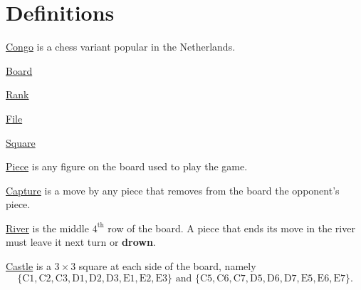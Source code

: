 \section{Definitions}

\vspace{0.5em}

\underline{Congo}
is a chess variant popular in the Netherlands.

\vspace{0.5em}

\underline{Board}

\vspace{0.5em}

\underline{Rank}

\vspace{0.5em}

\underline{File}

\vspace{0.5em}

\underline{Square}

\vspace{0.5em}

\underline{Piece}
is any figure on the board used to play the game.

\vspace{0.5em}

\underline{Capture}
is a move by any piece that removes from the board the opponent's piece.

\vspace{0.5em}

\underline{River}
is the middle $4^{\text{th}}$ row of the board. A piece that ends its move in
the river must leave it next turn or \textbf{drown}.

\vspace{0.5em}

\underline{Castle}
is a $3 \times 3$ square at each side of the board, namely
\begin{equation*}
\{
    \text{C1}, \text{C2}, \text{C3},
    \text{D1}, \text{D2}, \text{D3},
    \text{E1}, \text{E2}, \text{E3}
\}
\text{ and }
\{
    \text{C5}, \text{C6}, \text{C7},
    \text{D5}, \text{D6}, \text{D7},
    \text{E5}, \text{E6}, \text{E7}
\}.
\end{equation*}
